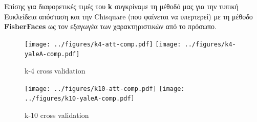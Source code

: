 Επίσης για διαφορετικές τιμές του \textbf{k} συγκρίναμε τη μέθοδό μας για την
τυπική Ευκλείδεια απόσταση και την Chisquare (που φαίνεται να υπερτερεί) με τη μέθοδο
\textbf{FisherFaces} ως τον εξαγωγέα των χαρακτηριστικών από το πρόσωπο.

\begin{figure}[htp]
    \centering
    \texttt{[image: ../figures/k4-att-comp.pdf]}\hfill
    \texttt{[image: ../figures/k4-yaleA-comp.pdf]}\hfill

    \caption{k-4 cross validation}
    \label{fig:bee}

\end{figure}

\begin{figure}[htp]
    \centering
    \texttt{[image: ../figures/k10-att-comp.pdf]}\hfill
    \texttt{[image: ../figures/k10-yaleA-comp.pdf]}\hfill

    \caption{k-10 cross validation}
    \label{fig:bee}

\end{figure}
